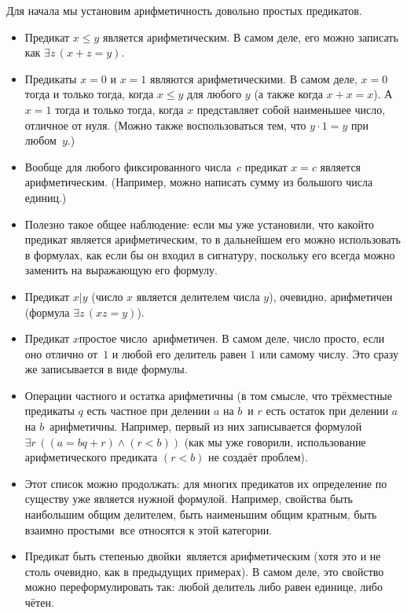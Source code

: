 Для начала мы установим арифметичность довольно простых
предикатов.

\begin{itemize}
        \item
Предикат $x\le y$ является арифметическим. В самом деле, его
можно записать как $\exists z\, (x+z=y)$.
        \item
Предикаты $x=0$ и $x=1$ являются арифметическими. В самом деле,
$x=0$ тогда и только тогда, когда $x\le y$ для любого $y$ (а
также когда $x+x=x$). А~$x=1$ тогда и только
тогда, когда $x$ представляет собой наименьшее число, отличное
от нуля. (Можно также воспользоваться тем, что $y\cdot 1=y$ при
любом~$y$.)
        \item
Вообще для любого фиксированного
числа~$c$ предикат ${x=c}$ является арифметическим.
(Например, можно написать сумму из большого числа единиц.)
        \item
Полезно такое общее наблюдение: если мы уже установили, что
какой\д то предикат является арифметическим, то в дальнейшем его
можно использовать в формулах, как если бы он входил в
сигнатуру, поскольку его всегда можно заменить на выражающую его
формулу.
        \item
Предикат $x|y$ (число $x$ является делителем числа $y$), очевидно,
арифметичен (формула $\exists z\, (xz=y)$).
        \item
Предикат  $x$\т простое число\ арифметичен. В самом деле, число
просто, если оно отлично от~$1$ и
любой его делитель равен $1$ или самому числу. Это
сразу же записывается в виде формулы.
        \item
Операции частного и остатка арифметичны (в том смысле, что
трёхместные предикаты  $q$ есть частное при делении $a$ на $b$\
и  $r$ есть остаток при делении $a$ на $b$\ арифметичны.
Например, первый из них записывается формулой
        $
\exists r\, ((a=bq+r)\land (r<b))
        $
(как мы уже говорили, использование арифметического предиката
$(r<b)$ не создаёт проблем).
        \item
Этот список можно продолжать: для многих предикатов их определение
по существу уже является нужной формулой. Например, свойства
 быть наибольшим общим делителем, \лк быть наименьшим
общим кратным\пк, \лк быть взаимно простыми\пк\ все относятся
к этой категории.
        \item
Предикат  быть степенью двойки\ является арифметическим
(хотя это и не столь очевидно, как в предыдущих примерах).
В самом деле, это свойство можно переформулировать так: любой
делитель либо равен единице, либо чётен.
\end{itemize}

